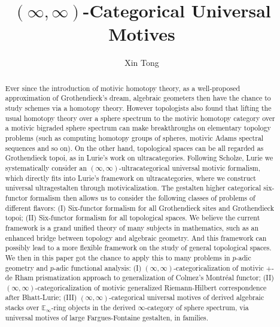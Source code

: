 \documentclass[12pt]{article}
\theoremstyle{definition}
\begin{document}
\title{$(\infty,\infty)$-Categorical Universal Motives}
\author{Xin Tong}
\date{}




\maketitle



\begin{abstract}
\noindent Ever since the introduction of motivic homotopy theory, as a well-proposed approximation of Grothendieck's dream, algebraic geometers then have the chance to study schemes via a homotopy theory. However topologists also found that lifting the usual homotopy theory over a sphere spectrum to the motivic homotopy category over a motivic bigraded sphere spectrum can make breakthroughs on elementary topology problems (such as computing homotopy groups of spheres, motivic Adams spectral sequences and so on). On the other hand, topological spaces can be all regarded as Grothendieck topoi, as in Lurie's work on ultracategories. Following Scholze, Lurie we systematically consider an $(\infty,\infty)$-ultracategorical universal motivic formalism, which directly fits into Lurie's framework on ultracategories, where we construct universal ultragestalten through motivicalization. The gestalten higher categorical six-functor formalism then allows us to consider the following classes of problems of different flavors: (I) Six-functor formalism for all Grothendieck sites and Grothendieck topoi; (II) Six-functor formalism for all topological spaces. We believe the current framework is a grand unified theory of many subjects in mathematics, such as an enhanced bridge between topology and algebraic geometry. And this framework can possibly lead to a more flexible framework on the study of general topological spaces. We then in this paper got the chance to apply this to many problems in $p$-adic geometry and $p$-adic functional analysis: (I) $(\infty,\infty)$-categoricalization of motivic $+$-de Rham prismatization approach to generalization of Colmez's Montr\'eal functor; (II) $(\infty,\infty)$-categoricalization of motivic generalized Riemann-Hilbert correspondence after Bhatt-Lurie; (III) $(\infty,\infty)$-categorical universal motives of derived algebraic stacks over $\mathbb{E}_\infty$-ring objects in the derived $\infty$-category of sphere spectrum, via universal motives of large Fargues-Fontaine gestalten, in families. 
\end{abstract}
\end{document}

